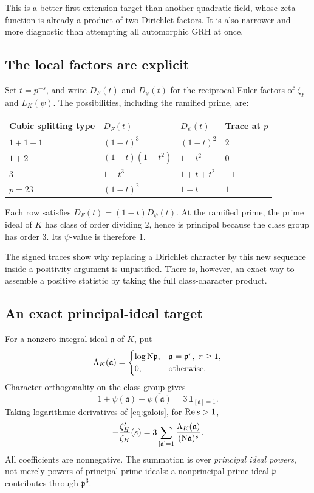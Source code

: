 This is a better first extension target than another quadratic field, whose zeta function is already a product of two Dirichlet factors. It is also narrower and more diagnostic than attempting all automorphic GRH at once.

\subsection{The local factors are explicit}

Set \(t=p^{-s}\), and write \(D_F(t)\) and \(D_\psi(t)\) for the reciprocal Euler factors of \(\zeta_F\) and \(L_K(\psi)\). The possibilities, including the ramified prime, are:

\begin{center}
\begin{tabular}{llll}
\toprule
Cubic splitting type & \(D_F(t)\) & \(D_\psi(t)\) & Trace at \(p\)\\
\midrule
\(1+1+1\) & \((1-t)^3\) & \((1-t)^2\) & \(2\)\\
\(1+2\) & \((1-t)(1-t^2)\) & \(1-t^2\) & \(0\)\\
\(3\) & \(1-t^3\) & \(1+t+t^2\) & \(-1\)\\
\(p=23\) & \((1-t)^2\) & \(1-t\) & \(1\)\\
\bottomrule
\end{tabular}
\end{center}

Each row satisfies \(D_F(t)=(1-t)D_\psi(t)\). At the ramified prime, the prime ideal of \(K\) has class of order dividing \(2\), hence is principal because the class group has order \(3\). Its \(\psi\)-value is therefore \(1\).

The signed traces show why replacing a Dirichlet character by this new sequence inside a positivity argument is unjustified. There is, however, an exact way to assemble a positive statistic by taking the full class-character product.

\subsection{An exact principal-ideal target}\label{sec:principal-target}

For a nonzero integral ideal \(\mathfrak a\) of \(K\), put
\[
\Lambda_K(\mathfrak a)=
\begin{cases}
\log\mathrm{N}\mathfrak p,&\mathfrak a=\mathfrak p^r,\ r\ge1,\\
0,&\text{otherwise}.
\end{cases}
\]
Character orthogonality on the class group gives
\[
1+\psi(\mathfrak a)+\overline{\psi(\mathfrak a)}
=3\,\mathbf1_{[\mathfrak a]=1}.
\]
Taking logarithmic derivatives of \eqref{eq:galois}, for \(\operatorname{Re} s>1\),
\begin{equation}\label{eq:class-logder}
-\frac{\zeta_H'}{\zeta_H}(s)
=3\sum_{[\mathfrak a]=1}\frac{\Lambda_K(\mathfrak a)}{(\mathrm{N}\mathfrak a)^s}.
\end{equation}
All coefficients are nonnegative. The summation is over \emph{principal ideal powers}, not merely powers of principal prime ideals: a nonprincipal prime ideal \(\mathfrak p\) contributes through \(\mathfrak p^3\).

